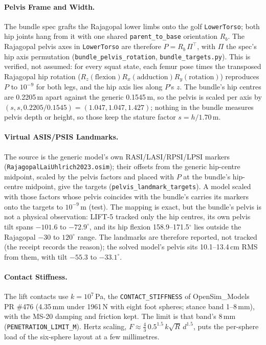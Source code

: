 \documentclass[11pt,a4paper]{article}
\begin{document}
\paragraph{Pelvis Frame and Width.} The bundle spec grafts the Rajagopal lower
limbs onto the golf \texttt{LowerTorso}; both hip joints hang from it with one
shared \texttt{parent\_to\_base} orientation $R_b$. The Rajagopal pelvis axes
in \texttt{LowerTorso} are therefore $P = R_b\,\Pi^\top$, with $\Pi$ the spec's
hip axis permutation (\texttt{bundle\_pelvis\_rotation},
\texttt{bundle\_targets.py}). This is verified, not assumed: for every squat
state, each femur pose times the transposed Rajagopal hip rotation
($R_z(\text{flexion})R_x(\text{adduction})R_y(\text{rotation})$) reproduces
$P$ to $10^{-9}$ for both legs, and the hip axis lies along $P$'s $z$. The
bundle's hip centres are 0.2205\,m apart against the generic 0.1545\,m, so the
pelvis is scaled per axis by $(s, s, 0.2205/0.1545) = (1.047, 1.047, 1.427)$;
nothing in the bundle measures pelvis depth or height, so those keep the
stature factor $s = h/1.70$\,m.

\paragraph{Virtual ASIS/PSIS Landmarks.} The source is the generic model's own
RASI/LASI/RPSI/LPSI markers (\texttt{RajagopalLaiUhlrich2023.osim}); their
offsets from the generic hip-centre midpoint, scaled by the pelvis factors and
placed with $P$ at the bundle's hip-centre midpoint, give the targets
(\texttt{pelvis\_landmark\_targets}). A model scaled with those factors whose
pelvis coincides with the bundle's carries its markers onto the targets to
$10^{-9}$\,m (test). The mapping is exact, but the bundle's pelvis is not a
physical observation: LIFT-5 tracked only the hip centres, its own pelvis tilt
spans $-101.6$ to $-72.9^\circ$, and its hip flexion 158.9--171.5$^\circ$ lies
outside the Rajagopal $-30$ to $120^\circ$ range. The landmarks are therefore
reported, not tracked (the receipt records the reason); the solved model's
pelvis sits 10.1--13.4\,cm RMS from them, with tilt $-55.3$ to $-33.1^\circ$.

\paragraph{Contact Stiffness.} The lift contacts use
$k = 10^7$\,Pa, the \texttt{CONTACT\_STIFFNESS} of OpenSim\_Models PR \#476
(4.35\,mm under 1961\,N with eight foot spheres; stance band 1--8\,mm), with the
MS-20 damping and friction kept. The limit is that band's 8\,mm
(\texttt{PENETRATION\_LIMIT\_M}). Hertz scaling,
$F \approx \tfrac{4}{3}\,0.5^{1.5}\,k\sqrt{R}\,d^{1.5}$, puts the per-sphere
load of the six-sphere layout at a few millimetres.
\end{document}
